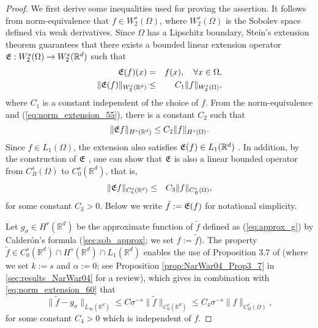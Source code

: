 \documentclass[11pt]{article}
\theoremstyle{remark}
\theoremstyle{example}
\theoremstyle{remark}
\newcommand{\fE}{{\frak E}}
\newcommand{\tf}{{\tilde{f}}}
\newcommand{\R}{\mathbb{R}}
\newcommand{\citep}{\cite}
\begin{document}
\begin{proof}
We first derive some inequalities used for proving the assertion. It follows from norm-equivalence that $f \in W_2^s(\Omega)$, where $W_2^s(\Omega)$ is the Sobolev space defined via weak derivatives.  
Since $\Omega$ has a Lipschitz boundary, Stein's extension theorem \cite[p.181]{Ste70} guarantees that there exists a bounded linear extension operator $\fE: W_2^s(\Omega) \to W_2^s(\R^d)$ such that 
\begin{eqnarray} 
\fE (f) (x) &=& f(x), \quad \forall x \in \Omega, \label{eq:extension_identity_54} \\
\| \fE (f) \|_{W_2^s(\R^d)} &\leq& C_1 \| f \|_{W_2^s(\Omega)}, \label{eq:norm_extension_55}
\end{eqnarray}
where $C_1$ is a constant independent of the choice of $f$.
From the norm-equivalence and (\ref{eq:norm_extension_55}), there is a constant $C_2$ such that 
\begin{equation}
\| \fE f \|_{H^s(\R^d)}
 \leq C_2 \| f \|_{H^s(\Omega)}. \label{eq:sobo_norm_92}
\end{equation}
Since $f \in L_1(\Omega)$, the extension also satisfies $\fE(f) \in L_1(\R^d)$ \cite[p.181]{Ste70}. In addition, by the construction of $\fE$ \cite[Eqs.(24)(31) on p.191]{Ste70}, one can show \citep[Section 3.2.2]{NarWarWen05} that $\fE$ is also a linear bounded operator from $C_B^s(\Omega)$ to $C_0^s(\R^d)$, that is,
\begin{eqnarray} 
\| \fE f \|_{C_0^s(\R^d)} &\leq& C_3 \| f \|_{C_B^s(\Omega)}, \label{eq:norm_extension_60}
\end{eqnarray}
for some constant $C_3>0$.  Below we write $\tf := \fE(f)$ for notational simplicity.

Let $g_{\sigma} \in H^r (\R^d)$ be the approximate function of $\tf$ defined as (\ref{eq:approx_g}) by Calder{\'o}n's formula (\ref{sec:sob_approx}; we set $f := \tf$). 
The property $\tf \in C_0^s(\R^d) \cap H^s(\R^d) \cap L_1(\R^d)$ enables the use of Proposition 3.7 of \cite{NarWar04} (where we set $k := s$ and $\alpha := 0$; see Proposition \ref{prop:NarWar04_Prop3_7} in \ref{sec:results_NarWar04} for a review), which gives in combination with \eqref{eq:norm_extension_60} that
\begin{equation}
\| \tf - g_{\sigma} \|_{L_\infty (\R^d)} 
\leq C \sigma^{-s} \| \tf \|_{C_0^s (\R^d)} 
\leq  C_4 \sigma^{-s} \| f \|_{C_B^s(\Omega)},  \label{eq:sob_sup}
\end{equation} 
for some constant $C_4>0$ which is independent of $f$. 


\end{proof}
\end{document}
